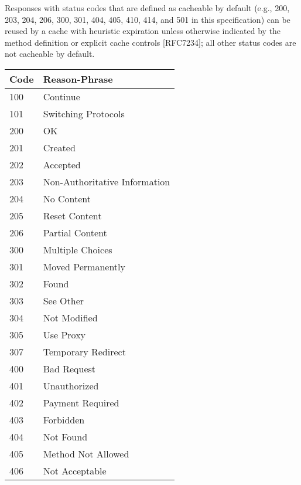    Responses with status codes that are defined as cacheable by default
   (e.g., 200, 203, 204, 206, 300, 301, 404, 405, 410, 414, and 501 in
   this specification) can be reused by a cache with heuristic
   expiration unless otherwise indicated by the method definition or
   explicit cache controls [RFC7234]; all other status codes are not
   cacheable by default.

   \begin{longtable}{|l|l|} 
      \hline
      \textbf{Code} & \textbf{Reason-Phrase}
   \\ \hline 100  & Continue                      
   \\ \hline 101  & Switching Protocols           
   \\ \hline 200  & OK                            
   \\ \hline 201  & Created                       
   \\ \hline 202  & Accepted                      
   \\ \hline 203  & Non-Authoritative Information 
   \\ \hline 204  & No Content                    
   \\ \hline 205  & Reset Content                 
   \\ \hline 206  & Partial Content               
   \\ \hline 300  & Multiple Choices              
   \\ \hline 301  & Moved Permanently             
   \\ \hline 302  & Found                         
   \\ \hline 303  & See Other                     
   \\ \hline 304  & Not Modified                  
   \\ \hline 305  & Use Proxy                     
   \\ \hline 307  & Temporary Redirect            
   \\ \hline 400  & Bad Request                   
   \\ \hline 401  & Unauthorized                  
   \\ \hline 402  & Payment Required              
   \\ \hline 403  & Forbidden                     
   \\ \hline 404  & Not Found                     
   \\ \hline 405  & Method Not Allowed            
   \\ \hline 406  & Not Acceptable                

\end{longtable}
